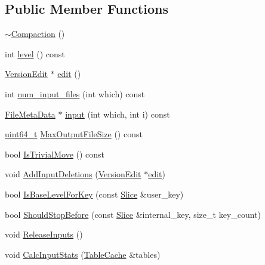\subsection*{Public Member Functions}
\begin{DoxyCompactItemize}
\item 
\hyperlink{classleveldb_1_1_compaction_ad29d60feea9dd53f54a2bd9301dbd9c4}{$\sim$\+Compaction} ()
\item 
int \hyperlink{classleveldb_1_1_compaction_aaf72769cc8dabece3e513399425f91fa}{level} () const 
\item 
\hyperlink{classleveldb_1_1_version_edit}{Version\+Edit} $\ast$ \hyperlink{classleveldb_1_1_compaction_a122e4f7b4fdb6c0d1862624742b34b3d}{edit} ()
\item 
int \hyperlink{classleveldb_1_1_compaction_a75bcfebad0f838380ef7f63dc083e992}{num\+\_\+input\+\_\+files} (int which) const 
\item 
\hyperlink{structleveldb_1_1_file_meta_data}{File\+Meta\+Data} $\ast$ \hyperlink{classleveldb_1_1_compaction_a989d147c33f2993d4503c56ea0ee3a78}{input} (int which, int i) const 
\item 
\hyperlink{stdint_8h_aaa5d1cd013383c889537491c3cfd9aad}{uint64\+\_\+t} \hyperlink{classleveldb_1_1_compaction_a02ecf935a684691ef864a8997bfab793}{Max\+Output\+File\+Size} () const 
\item 
bool \hyperlink{classleveldb_1_1_compaction_a9d88e4a33ba63749cb0f0f04fbc74968}{Is\+Trivial\+Move} () const 
\item 
void \hyperlink{classleveldb_1_1_compaction_abb1acdc9b882a7497603b13386e7e1a7}{Add\+Input\+Deletions} (\hyperlink{classleveldb_1_1_version_edit}{Version\+Edit} $\ast$\hyperlink{classleveldb_1_1_compaction_a122e4f7b4fdb6c0d1862624742b34b3d}{edit})
\item 
bool \hyperlink{classleveldb_1_1_compaction_ae982beb6ee52d92de76a363ef0eefc29}{Is\+Base\+Level\+For\+Key} (const \hyperlink{classleveldb_1_1_slice}{Slice} \&user\+\_\+key)
\item 
bool \hyperlink{classleveldb_1_1_compaction_a521fc9c5528039c4edd9547f25f7a868}{Should\+Stop\+Before} (const \hyperlink{classleveldb_1_1_slice}{Slice} \&internal\+\_\+key, size\+\_\+t key\+\_\+count)
\item 
void \hyperlink{classleveldb_1_1_compaction_a87ec90747d22dce0d103149db1ecf709}{Release\+Inputs} ()
\item 
void \hyperlink{classleveldb_1_1_compaction_a1110699585818b5212119724f8d9b7aa}{Calc\+Input\+Stats} (\hyperlink{classleveldb_1_1_table_cache}{Table\+Cache} \&tables)

\end{DoxyCompactItemize}
